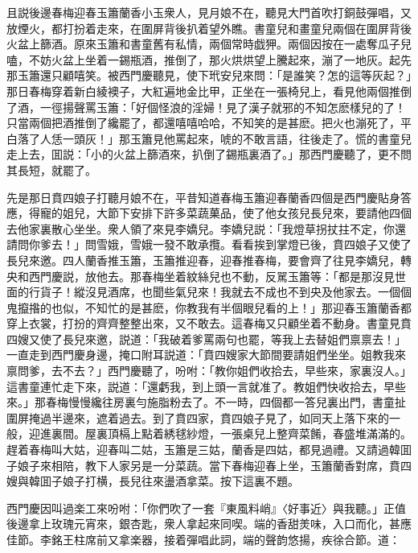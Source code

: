 且説後邊春梅迎春玉簫蘭香小玉衆人，見月娘不在，聽見大門首吹打銅鼓彈唱，又放煙火，都打扮着走來，在圍屏背後扒着望外瞧。書童兒和畫童兒兩個在圍屏背後火盆上篩酒。原來玉簫和書童舊有私情，兩個常時戯狎。兩個因按在一處奪瓜子兒嗑，不妨火盆上坐着一錫瓶酒，推倒了，那火烘烘望上騰起來，漰了一地灰。起先那玉簫還只顧嘻笑。被西門慶聽見，使下玳安兒來問：「是誰笑？怎的這等灰起？」那日春梅穿着新白綾襖子，大紅遍地金比甲，正坐在一張椅兒上，看見他兩個推倒了酒，一徑揚聲罵玉簫：「好個怪浪的淫婦！見了漢子就邪的不知怎麽樣兒的了！只當兩個把酒推倒了纔罷了，都還嘻嘻哈哈，不知笑的是甚麽。把火也漰死了，平白落了人恁一頭灰！」那玉簫見他罵起來，唬的不敢言語，往後走了。慌的書童兒走上去，囬説：「小的火盆上篩酒來，扒倒了錫瓶裏酒了。」那西門慶聽了，更不問其長短，就罷了。

先是那日賁四娘子打聽月娘不在，平昔知道春梅玉簫迎春蘭香四個是西門慶貼身答應，得寵的姐兒，大節下安排下許多菜蔬菓品，使了他女孩兒長兒來，要請他四個去他家裏散心坐坐。衆人領了來見李嬌兒。李嬌兒説：「我燈草拐扙拄不定，你還請問你爹去！」問雪娥，雪娥一發不敢承攬。看看挨到掌燈已後，賁四娘子又使了長兒來邀。四人蘭香推玉簫，玉簫推迎春，迎春推春梅，要會齊了往見李嬌兒，轉央和西門慶説，放他去。那春梅坐着紋絲兒也不動，反駡玉簫等：「都是那沒見世面的行貨子！縱沒見酒席，也聞些氣兒來！我就去不成也不到央及他家去。一個個鬼攛揝的也似，不知忙的是甚麽，你教我有半個眼兒看的上！」那迎春玉簫蘭香都穿上衣裳，打扮的齊齊整整出來，又不敢去。這春梅又只顧坐着不動身。書童見賁四嫂又使了長兒來邀，説道：「我破着爹罵兩句也罷，等我上去替姐們禀禀去！」一直走到西門慶身邊，掩口附耳説道：「賁四嫂家大節間要請姐們坐坐。姐教我來禀問爹，去不去？」西門慶聽了，吩咐：「教你姐們收拾去，早些來，家裏沒人。」這書童連忙走下來，説道：「還虧我，到上頭一言就准了。教姐們快收拾去，早些來。」那春梅慢慢纔往房裏勻施脂粉去了。不一時，四個都一答兒裏出門，書童扯圍屏掩過半邊來，遮着過去。到了賁四家，賁四娘子見了，如同天上落下來的一般，迎進裏間。屋裏頂槅上點着綉毬紗燈，一張桌兒上整齊菜餚，春盛堆滿滿的。趕着春梅叫大姑，迎春叫二姑，玉簫是三姑，蘭香是四姑，都見過禮。又請過韓囬子娘子來相陪，教下人家另是一分菜蔬。當下春梅迎春上坐，玉簫蘭香對席，賁四嫂與韓囬子娘子打横，長兒往來盪酒拿菜。按下這裏不題。

西門慶因叫過楽工來吩咐：「你們吹了一套『東風料峭』〈好事近〉與我聽。」正值後邊拿上玫瑰元宵來，銀杏匙，衆人拿起來同喫。端的香甜羙味，入口而化，甚應佳節。李銘王柱席前又拿楽器，接着彈唱此詞，端的聲韵悠揚，疾徐合節。道：

